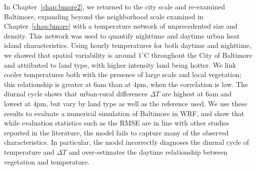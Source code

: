 In Chapter~\ref{chap:bmore2}, we returned to the city scale and re-examined Baltimore, expanding beyond the neighborhood scale examined in Chapter~\ref{chap:bmore} with a temperature network of unprecedented size and density. This network was used to
quantify nighttime and daytime urban heat island characteristics. Using hourly temperatures for both daytime and nighttime, we showed that 
spatial variability is around $1^\circ$C throughout the City of Baltimore and attributed to land type, with higher intensity land being hotter. 
We link cooler temperatures both with the presence of large scale and local vegetation; this relationship is greater at 6am than at 4pm, when the correlation is low. The diurnal cycle shows that urban-rural differences $\Delta T$ are highest at 6am and lowest at 4pm, but vary by land type as well as the reference used. We use these results to evaluate a numerical simulation of Baltimore in WRF, and show that while evaluation statistics such as the RMSE are in line with other studies reported in the literature, the model fails to capture many of the observed characteristics. In particular, the model incorrectly diagnoses the diurnal cycle of temperature and $\Delta T$ and over-estimates the daytime relationship between vegetation and temperature. 

